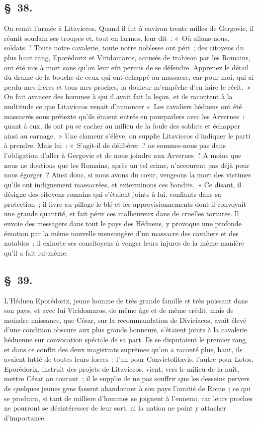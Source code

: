 \documentclass[french,twoside]{book} %
\begin{document}
\subsection[{§ 38.}]{ \textsc{§ 38.} }
\noindent On remit l’armée à Litaviccos. Quand il fut à environ trente milles de Gergovie, il réunit soudain ses troupes et, tout en larmes, leur dit : « Où allons-nous, soldats ? Toute notre cavalerie, toute notre noblesse ont péri ; des citoyens du plus haut rang, Eporédorix et Viridomaros, accusés de trahison par les Romains, ont été mis à mort sans qu’on leur eût permis de se défendre. Apprenez le détail du drame de la bouche de ceux qui ont échappé au massacre, car pour moi, qui ai perdu mes frères et tous mes proches, la douleur m’empêche d’en faire le récit. » On fait avancer des hommes à qui il avait fait la leçon, et ils racontent à la multitude ce que Litaviccos venait d’annoncer « Les cavaliers héduens ont été massacrés sous prétexte qu’ils étaient entrés en pourparlers avec les Arvernes ; quant à eux, ils ont pu se cacher au milieu de la foule des soldats et échapper ainsi au carnage. » Une clameur s’élève, on supplie Litaviccos d’indiquer le parti à prendre. Mais lui : « S'agit-il de délibérer ? ne sommes-nous pas dans l’obligation d’aller à Gergovie et de nous joindre aux Arvernes ? A moins que nous ne doutions que les Romains, après un tel crime, n’accourent pas déjà pour nous égorger ? Ainsi donc, si nous avons du cœur, vengeons la mort des victimes qu’ils ont indignement massacrées, et exterminons ces bandits. » Ce disant, il désigne des citoyens romains qui s’étaient joints à lui, confiants dans sa protection ; il livre au pillage le blé et les approvisionnements dont il convoyait une grande quantité, et fait périr ces malheureux dans de cruelles tortures. Il envoie des messagers dans tout le pays des Héduens, y provoque une profonde émotion par la même nouvelle mensongère d’un massacre des cavaliers et des notables ; il exhorte ses concitoyens à venger leurs injures de la même manière qu’il a fait lui-même.
\subsection[{§ 39.}]{ \textsc{§ 39.} }
\noindent L'Héduen Eporédorix, jeune homme de très grande famille et très puissant dans son pays, et avec lui Viridomaros, de même âge et de même crédit, mais de moindre naissance, que César, sur la recommandation de Diviciacos, avait élevé d’une condition obscure aux plus grands honneurs, s’étaient joints à la cavalerie héduenne sur convocation spéciale de sa part. Ils se disputaient le premier rang, et dans ce conflit des deux magistrats suprêmes qu’on a raconté plus, haut, ils avaient lutté de toutes leurs forces : l’un pour Convictolitavis, l’autre pour Lotos. Eporédorix, instruit des projets de Litaviccos, vient, vers le milieu de la nuit, mettre César au courant ; il le supplie de ne pas souffrir que les desseins pervers de quelques jeunes gens fassent abandonner à son pays l’amitié de Rome ; ce qui se produira, si tant de milliers d’hommes se joignent à l’ennemi, car leurs proches ne pourront se désintéresser de leur sort, ni la nation ne point y attacher d’importance.
\end{document}
